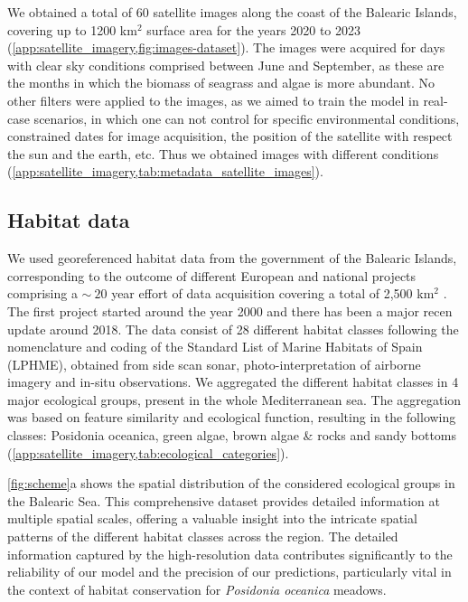 We obtained a total of 60 satellite images along the coast of the Balearic
Islands, covering up to 1200 km$^2$ surface area for the years 2020 to 2023
(\cref{app:satellite_imagery,fig:images-dataset}). The images were
acquired for days with clear sky conditions comprised between June and
September, as these are the months in which the biomass of seagrass and algae
is more abundant. No other filters were applied to the images, as we aimed to
train the model in real-case scenarios, in which one can not control for
specific
environmental conditions, constrained dates for image acquisition, the position
of the satellite with respect the sun and the earth, etc. Thus we obtained
images with different conditions
(\cref{app:satellite_imagery,tab:metadata_satellite_images}).

\subsection{Habitat data}

We used georeferenced habitat data from the government of the Balearic
Islands, corresponding to the outcome of different European and national
projects comprising a $\sim~20$ year effort of data acquisition covering a
total of 2,500 km$^2$ \cite{cartografia,ValleVillalonga2023}.
The first
project started
around the year
2000 and there has been a major recen update around 2018. The data consist of
28 different habitat classes following the nomenclature and coding of the
Standard List of Marine Habitats of Spain (LPHME), obtained from side scan
sonar, photo-interpretation of airborne imagery and in-situ observations. We
aggregated the different habitat classes in 4 major ecological groups, present
in the whole Mediterranean sea. The aggregation was based on feature similarity
and ecological function, resulting in the following classes: Posidonia
oceanica, green algae, brown algae \& rocks and sandy bottoms
(\cref{app:satellite_imagery,tab:ecological_categories}).

\cref{fig:scheme}a shows the spatial distribution of the considered ecological
groups in the Balearic Sea. This comprehensive dataset provides detailed
information at multiple spatial scales, offering a valuable insight into the
intricate spatial patterns of the different habitat classes across the region.
The detailed information captured by the high-resolution data contributes
significantly to the reliability of our model and the precision of our
predictions, particularly vital in the context of habitat
conservation for \textit{Posidonia oceanica} meadows.

